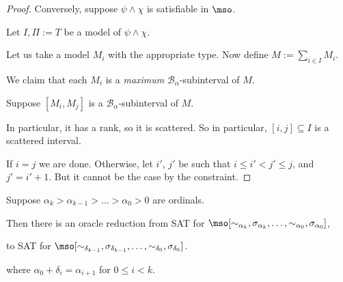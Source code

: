 \begin{proof}
  Conversely, suppose $\psi \land \chi$ is satisfiable in $\mso$.

  Let $I, \Pi := T$ be a model of $\psi \land \chi$.

  Let us take a model $M_i$ with the appropriate type.
  Now define $M := \sum_{i \in I} M_i$.

  We claim that each $M_i$ is a \emph{maximum} $\mathcal{B}_{\alpha}$-subinterval
  of $M$.

  Suppose $[M_i, M_j]$ is a $\mathcal{B}_{\alpha}$-subinterval of $M$.

  In particular, it has a rank, so it is scattered. So in particular,
  $[i, j] \subseteq I$ is a scattered interval.

  If $i = j$ we are done. Otherwise, let $i'$, $j'$ be such that $i \le i' < j' \le j$,
  and $j' = i' + 1$.  But it cannot be the case by the constraint.


\end{proof}

\begin{theorem}
  Suppose $\alpha_k > \alpha_{k - 1} > \ldots > \alpha_0 > 0$ are ordinals.

  Then there is an oracle reduction from SAT for $\mso[
      \sim_{\alpha_k}, \sigma_{\alpha_k}, \ldots, \sim_{\alpha_0}, \sigma_{\alpha_0}]$,

  to SAT for $\mso[
      \sim_{\delta_{k-1}}, \sigma_{\delta_{k-1}}, \ldots, \sim_{\delta_0}, \sigma_{\delta_0}]$.

  where $\alpha_0 + \delta_i = \alpha_{i + 1}$ for $0 \le i < k$.
\end{theorem}

